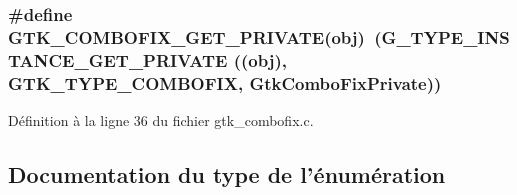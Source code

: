 \subsubsection[{GTK\_\-COMBOFIX\_\-GET\_\-PRIVATE}]{\setlength{\rightskip}{0pt plus 5cm}\#define GTK\_\-COMBOFIX\_\-GET\_\-PRIVATE(obj)~(G\_\-TYPE\_\-INSTANCE\_\-GET\_\-PRIVATE ((obj), GTK\_\-TYPE\_\-COMBOFIX, {\bf GtkComboFixPrivate}))}\label{gtk__combofix_8c_a36451c4cdc101baf60ebe2267f070e7f}


Définition à la ligne 36 du fichier gtk\_\-combofix.c.



\subsection{Documentation du type de l'énumération}
